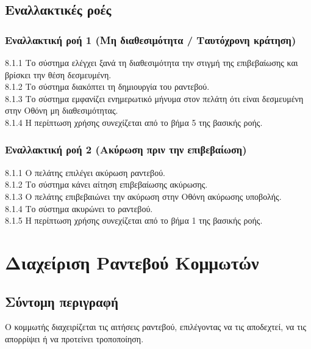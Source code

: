 \documentclass[12pt,a4paper,twoside]{book}
\begin{document}
\subsection{Εναλλακτικές ροές}

\subsubsection*{Εναλλακτική ροή 1 (Μη διαθεσιμότητα / Ταυτόχρονη κράτηση)}
8.1.1 Το σύστημα ελέγχει ξανά τη διαθεσιμότητα την στιγμή της επιβεβαίωσης και βρίσκει την θέση δεσμευμένη.\\
\hspace*{\parindent}8.1.2 Το σύστημα διακόπτει τη δημιουργία του ραντεβού.\\
\hspace*{\parindent}8.1.3 Το σύστημα εμφανίζει ενημερωτικό μήνυμα στον πελάτη ότι είναι δεσμευμένη στην Οθόνη μη διαθεσιμότητας.\\
\hspace*{\parindent}8.1.4 Η περίπτωση χρήσης συνεχίζεται από το βήμα 5 της βασικής ροής.

\subsubsection*{Εναλλακτική ροή 2 (Ακύρωση πριν την επιβεβαίωση)}
8.1.1 Ο πελάτης επιλέγει ακύρωση ραντεβού.\\
\hspace*{\parindent}8.1.2 Το σύστημα κάνει αίτηση επιβεβαίωσης ακύρωσης.\\
\hspace*{\parindent}8.1.3 Ο πελάτης επιβεβαιώνει την ακύρωση στην Οθόνη ακύρωσης υποβολής.\\
\hspace*{\parindent}8.1.4 Το σύστημα ακυρώνει το ραντεβού.\\
\hspace*{\parindent}8.1.5 Η περίπτωση χρήσης συνεχίζεται από το βήμα 1 της βασικής ροής.

\section{Διαχείριση Ραντεβού Κομμωτών}

\subsection{Σύντομη περιγραφή}
Ο κομμωτής διαχειρίζεται τις αιτήσεις ραντεβού, επιλέγοντας να τις αποδεχτεί, να τις απορρίψει ή να προτείνει τροποποίηση.
\end{document}
